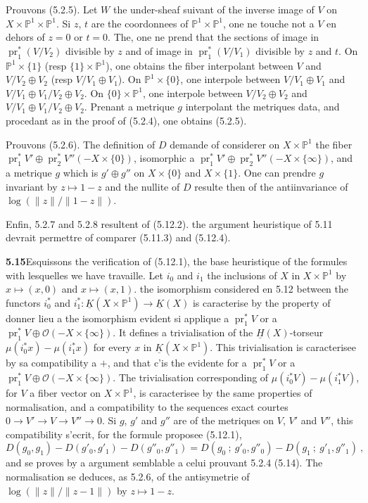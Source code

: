 \documentclass[12pt,a4paper]{article}
\theoremstyle{plain}
\theoremstyle{definition}
\theoremstyle{remark}
\newcommand{\bbP}{\mathbb{P}}
\newcommand{\calO}{\mathcal{O}}
\DeclareMathOperator{\pr}{pr}
\newcommand{\ubK}{\underline{K}}
\newcommand{\ubH}{\underline{H}}
\begin{document}
Prouvons (5.2.5). Let $W$ the under-sheaf suivant of the inverse image of $V$ on $X \times \bbP^1 \times \bbP^1$. Si $z$, $t$ are the coordonnees of $\bbP^1 \times \bbP^1$, one ne touche not a $V$ en dehors of $z=0$ or $t=0$. The, one ne prend that the sections of image in $\pr_1^*(V/V_2)$ divisible by $z$ and of image in $\pr_1^*(V/V_1)$ divisible by $z$ and $t$. On $\bbP^1 \times \{1\}$ (resp $\{1\} \times \bbP^1$), one obtains the fiber interpolant between $V$ and $V/V_2 \oplus V_2$ (resp $V/V_1 \oplus V_1$). On $\bbP^1 \times \{0\}$, one interpole between $V/V_1 \oplus V_1$ and $V/V_1 \oplus V_1/V_2 \oplus V_2$. On $\{0\} \times \bbP^1$, one interpole between $V/V_2 \oplus V_2$ and $V/V_1 \oplus V_1/V_2 \oplus V_2$. Prenant a metrique $g$ interpolant the metriques data, and procedant as in the proof of (5.2.4), one obtains (5.2.5).

Prouvons (5.2.6). The definition of $D$ demande of considerer on $X \times \bbP^1$ the fiber $\pr_1^*V' \oplus \pr_2^*V''(-X \times \{0\})$, isomorphic a $\pr_1^*V' \oplus \pr_2^*V''(-X \times \{\infty\})$, and a metrique $g$ which is $g' \oplus g''$ on $X \times \{0\}$ and $X \times \{1\}$. One can prendre $g$ invariant by $z \mapsto 1-z$ and the nullite of $D$ resulte then of the antiinvariance of $\log(\|z\|/\|1-z\|)$.

Enfin, 5.2.7 and 5.2.8 resultent of (5.12.2). the argument heuristique of 5.11 devrait permettre of comparer (5.11.3) and (5.12.4).

\medskip
\noindent\textbf{5.15}\quad Esquissons the verification of (5.12.1), the base heuristique of the formules with lesquelles we have travaille. Let $i_0$ and $i_1$ the inclusions of $X$ in $X \times \bbP^1$ by $x \mapsto (x,0)$ and $x \mapsto (x,1)$. the isomorphism considered en 5.12 between the functors $i_0^*$ and $i_1^* : \ubK(X \times \bbP^1) \to \ubK(X)$ is caracterise by the property of donner lieu a the isomorphism evident si applique a $\pr_1^*V$ or a $\pr_1^*V \oplus \calO(-X \times \{\infty\})$. It defines a trivialisation of the $\ubH(X)$-torseur $\mu(i_0^*x) - \mu(i_1^*x)$ for every $x$ in $\ubK(X \times \bbP^1)$. This trivialisation is caracterisee by sa compatibility a $+$, and that c'is the evidente for a $\pr_1^*V$ or a $\pr_1^*V \oplus \calO(-X \times \{\infty\})$. The trivialisation corresponding of $\mu(i_0^*V) - \mu(i_1^*V)$, for $V$ a fiber vector on $X \times \bbP^1$, is caracterisee by the same properties of normalisation, and a compatibility to the sequences exact courtes $0 \to V' \to V \to V'' \to 0$. Si $g$, $g'$ and $g''$ are of the metriques on $V$, $V'$ and $V''$, this compatibility s'ecrit, for the formule proposee (5.12.1),
\[
D(g_0, g_1) - D(g'_0, g'_1) - D(g''_0, g''_1) = D(g_0 \ ; \ g'_0, g''_0) - D(g_1 \ ; \ g'_1, g''_1) \ ,
\]
and se proves by a argument semblable a celui prouvant 5.2.4 (5.14). The normalisation se deduces, as 5.2.6, of the antisymetrie of $\log(\|z\|/\|z-1\|)$ by $z \mapsto 1-z$.
\end{document}
